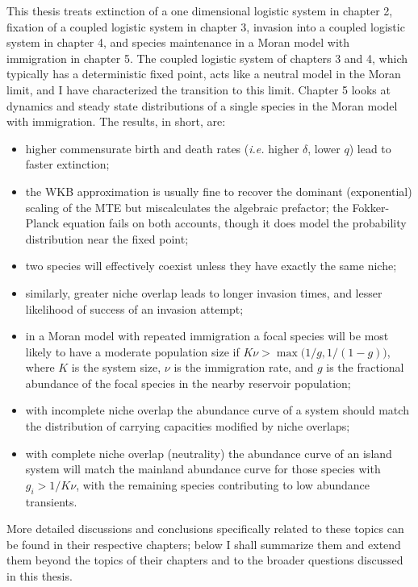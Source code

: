 
This thesis treats extinction of a one dimensional logistic system in chapter 2, fixation of a coupled logistic system in chapter 3, invasion into a coupled logistic system in chapter 4, and species maintenance in a Moran model with immigration in chapter 5. 
The coupled logistic system of chapters 3 and 4, which typically has a deterministic fixed point, acts like a neutral model in the Moran limit, and I have characterized the transition to this limit. 
Chapter 5 looks at dynamics and steady state distributions of a single species in the Moran model with immigration. 
The results, in short, are: 
\begin{itemize}
	\item higher commensurate birth and death rates (\emph{i.e.} higher $\delta$, lower $q$) lead to faster extinction; 
	\item the WKB approximation is usually fine to recover the dominant (exponential) scaling of the MTE but miscalculates the algebraic prefactor; the Fokker-Planck equation fails on both accounts, though it does model the probability distribution near the fixed point; 
	\item two species will effectively coexist unless they have exactly the same niche; 
	\item similarly, greater niche overlap leads to longer invasion times, and lesser likelihood of success of an invasion attempt; 
	\item in a Moran model with repeated immigration a focal species will be most likely to have a moderate population size if $K\nu > \max\big(1/g,1/(1-g)\big)$, where $K$ is the system size, $\nu$ is the immigration rate, and $g$ is the fractional abundance of the focal species in the nearby reservoir population;
	\item with incomplete niche overlap the abundance curve of a system should match the distribution of carrying capacities modified by niche overlaps;
	\item with complete niche overlap (neutrality) the abundance curve of an island system will match the mainland abundance curve for those species with $g_i>1/K\nu$, with the remaining species contributing to low abundance transients. 
\end{itemize}
More detailed discussions and conclusions specifically related to these topics can be found in their respective chapters; below I shall summarize them and extend them beyond the topics of their chapters and to the broader questions discussed in this thesis. 


